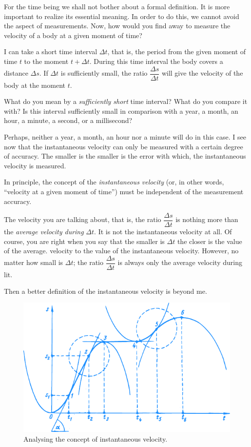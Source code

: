 {\athr For the time being we shall not bother about a formal definition. It is more important to realize its essential meaning. In order to do this, we cannot avoid the aspect of measurements. Now, how would you find away to measure the velocity of a body at a given moment of time?

\rdr I can take a short time interval $\Delta t$, that is, the period from the given moment of time $t$ to the moment $t + \Delta t$. During this time interval the body covers a distance $\Delta s$. If $\Delta t$ is sufficiently small, the ratio $\dfrac{\Delta s}{\Delta t}$ will give the velocity of the body at the moment $t$. 

\athr What do you mean by a \emph{sufficiently short} time interval? What do you compare it with? Is this interval sufficiently small in comparison with a year, a month, an hour, a minute, a second, or a millisecond?	

\rdr Perhaps, neither a year, a month, an hour nor a minute will do in this case. I see now that the instantaneous velocity can only be measured with a certain degree of accuracy. The smaller is  the smaller is the error with
which, the instantaneous velocity is measured. 

\athr In principle, the concept of the \emph{instantaneous velocity} (or, in other words, ``velocity at a given moment of time'') must be independent of the measurement accuracy. 

The velocity you are talking about, that is, the ratio $\dfrac{\Delta s}{\Delta t}$
is nothing more than the \emph{average velocity during} $\Delta t$. It is not the instantaneous velocity at all. Of course, you are right when you say that the smaller is $\Delta t$ the closer is the value of the average. velocity to the value of the instantaneous velocity. However, no matter how small is $\Delta t$; the
ratio $\dfrac{\Delta s}{\Delta t}$ is always only the average velocity during lit.

\rdr Then a better definition of the instantaneous velocity is beyond me.

\begin{figure}[!ht]%
\centering
\includegraphics[width=\textwidth]{figures/fig-31.pdf}
\caption{Analysing the concept of instantaneous velocity.}
\label{fig-31}
\end{figure}

}
